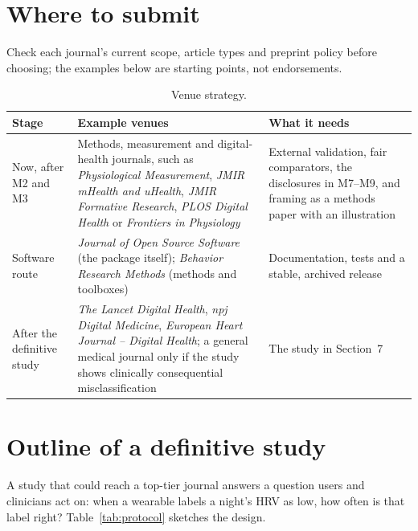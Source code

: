 \documentclass[11pt,a4paper]{article}
\begin{document}
\section{Where to submit}
Check each journal's current scope, article types and preprint policy before choosing; the examples below are starting points, not endorsements.

\begin{table}[H]
\centering\small
\caption{Venue strategy.}
\begin{tabularx}{\textwidth}{@{}p{}YY@{}}
\toprule
Stage & Example venues & What it needs \\
\midrule
Now, after M2 and M3 & Methods, measurement and digital-health journals, such as \textit{Physiological Measurement}, \textit{JMIR mHealth and uHealth}, \textit{JMIR Formative Research}, \textit{PLOS Digital Health} or \textit{Frontiers in Physiology} & External validation, fair comparators, the disclosures in M7--M9, and framing as a methods paper with an illustration \\
Software route & \textit{Journal of Open Source Software} (the package itself); \textit{Behavior Research Methods} (methods and toolboxes) & Documentation, tests and a stable, archived release \\
After the definitive study & \textit{The Lancet Digital Health}, \textit{npj Digital Medicine}, \textit{European Heart Journal -- Digital Health}; a general medical journal only if the study shows clinically consequential misclassification & The study in Section~7 \\
\bottomrule
\end{tabularx}
\end{table}

\section{Outline of a definitive study}
A study that could reach a top-tier journal answers a question users and clinicians act on: when a wearable labels a night's HRV as low, how often is that label right? Table~\ref{tab:protocol} sketches the design.
\end{document}
